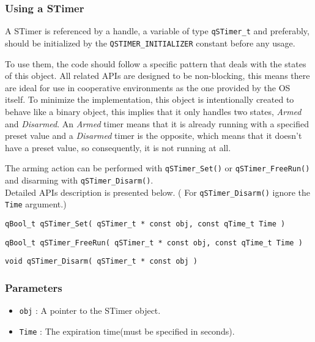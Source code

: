\subsubsection{Using a STimer}
A STimer is referenced by a handle, a variable of type \lstinline{qSTimer_t}  and preferably, should be initialized by the \lstinline{QSTIMER_INITIALIZER} constant before any usage. 

To use them, the code should follow a specific pattern that deals with the states of this object. All related APIs are designed to be non-blocking, this means there are ideal for use in cooperative environments as the one provided by the OS itself. To minimize the implementation, this object is intentionally created to behave like a binary object, this implies that it only handles two states, \textit{Armed} and \textit{Disarmed}. 
\newline
An \textit{Armed} timer means that it is already running with a specified preset value and a \textit{Disarmed} timer is the opposite, which means that it doesn't have a preset value, so consequently, it is not running at all.

The arming action can be performed with \lstinline{qSTimer_Set()}  or \lstinline{qSTimer_FreeRun()}  and disarming with \lstinline{qSTimer_Disarm()}. \\

Detailed APIs description is presented below. ( For \lstinline{qSTimer_Disarm()} ignore the \lstinline{Time} argument.)\\

\begin{lstlisting}[style=CStyle]
qBool_t qSTimer_Set( qSTimer_t * const obj, const qTime_t Time )
\end{lstlisting}

\begin{lstlisting}[style=CStyle]
qBool_t qSTimer_FreeRun( qSTimer_t * const obj, const qTime_t Time )
\end{lstlisting}

\begin{lstlisting}[style=CStyle]
void qSTimer_Disarm( qSTimer_t * const obj )
\end{lstlisting}

\subsubsection*{Parameters}
\begin{itemize}
    \item \lstinline{obj} : A pointer to the STimer object. 
    \item \lstinline{Time} : The expiration time(must be specified in seconds).
\end{itemize}

